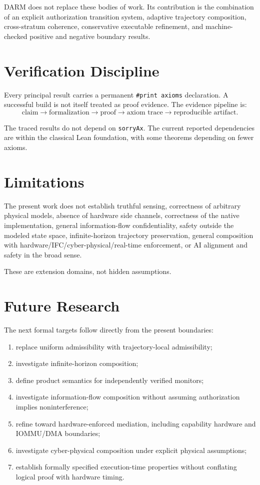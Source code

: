 \documentclass[11pt]{article}
\begin{document}
DARM does not replace these bodies of work. Its contribution is the combination of an explicit authorization transition system, adaptive trajectory composition, cross-stratum coherence, conservative executable refinement, and machine-checked positive and negative boundary results.

\section{Verification Discipline}
Every principal result carries a permanent \texttt{\#print axioms} declaration. A successful build is not itself treated as proof evidence. The evidence pipeline is:
\[
\text{claim}\rightarrow\text{formalization}\rightarrow\text{proof}\rightarrow\text{axiom trace}\rightarrow\text{reproducible artifact}.
\]

The traced results do not depend on \texttt{sorryAx}. The current reported dependencies are within the classical Lean foundation, with some theorems depending on fewer axioms.

\section{Limitations}
The present work does not establish truthful sensing, correctness of arbitrary physical models, absence of hardware side channels, correctness of the native implementation, general information-flow confidentiality, safety outside the modeled state space, infinite-horizon trajectory preservation, general composition with hardware/IFC/cyber-physical/real-time enforcement, or AI alignment and safety in the broad sense.

These are extension domains, not hidden assumptions.

\section{Future Research}
The next formal targets follow directly from the present boundaries:
\begin{enumerate}[leftmargin=*]
\item replace uniform admissibility with trajectory-local admissibility;
\item investigate infinite-horizon composition;
\item define product semantics for independently verified monitors;
\item investigate information-flow composition without assuming authorization implies noninterference;
\item refine toward hardware-enforced mediation, including capability hardware and IOMMU/DMA boundaries;
\item investigate cyber-physical composition under explicit physical assumptions;
\item establish formally specified execution-time properties without conflating logical proof with hardware timing.
\end{enumerate}
\end{document}

